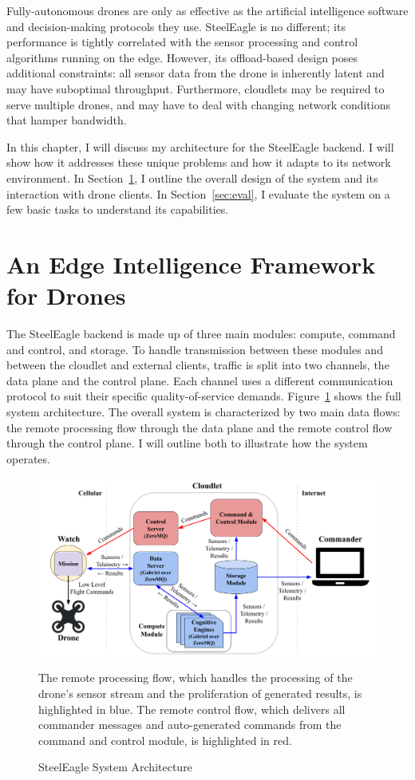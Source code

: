 Fully-autonomous drones are only as effective as the artificial intelligence software and decision-making protocols they use. SteelEagle is no different; its performance is tightly correlated with the sensor processing and control algorithms running on the edge. However, its offload-based design poses additional constraints: all sensor data from the drone is inherently latent and may have suboptimal throughput. Furthermore, cloudlets may be required to serve multiple drones, and may have to deal with changing network conditions that hamper bandwidth.

In this chapter, I will discuss my architecture for the SteelEagle backend. I will show how it addresses these unique problems and how it adapts to its network environment. In Section~\ref{sec:remote-intelligence-framework}, I outline the overall design of the system and its interaction with drone clients. In Section~\ref{sec:eval}, I evaluate the system on a few basic tasks to understand its capabilities.

\section{An Edge Intelligence Framework for Drones}
\label{sec:remote-intelligence-framework}
The SteelEagle backend is made up of three main modules: compute, command and control, and storage. To handle transmission between these modules and between the cloudlet and external clients, traffic is split into two channels, the data plane and the control plane. Each channel uses a different communication protocol to suit their specific quality-of-service demands. Figure~\ref{fig:sys-arch} shows the full system architecture. The overall system is characterized by two main data flows: the remote processing flow through the data plane and the remote control flow through the control plane. I will outline both to illustrate how the system operates.

\begin{figure}
    \centering
    \includegraphics[width=0.9\linewidth]{chapter4/FIGS/arch.png}
    \begin{captext}
    \small The remote processing flow, which handles the processing of the drone's sensor stream and the proliferation of generated results, is highlighted in blue. The remote control flow, which delivers all commander messages and auto-generated commands from the command and control module, is highlighted in red.
    \end{captext}
    \caption{SteelEagle System Architecture}
    \label{fig:sys-arch}
\end{figure}

